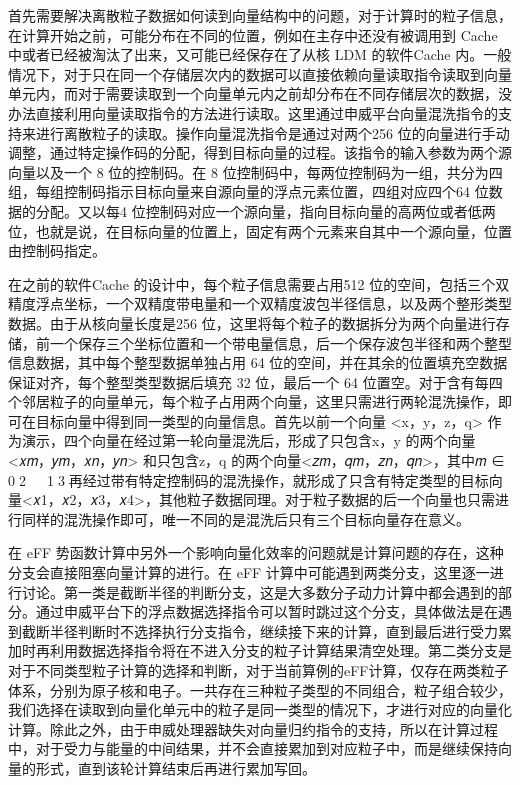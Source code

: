 首先需要解决离散粒子数据如何读到向量结构中的问题，对于计算时的粒子信息，在计算开始之前，可能分布在不同的位置，例如在主存中还没有被调用到 Cache 中或者已经被淘汰了出来，又可能已经保存在了从核 LDM 的软件Cache 内。一般情况下，对于只在同一个存储层次内的数据可以直接依赖向量读取指令读取到向量单元内，而对于需要读取到一个向量单元内之前却分布在不同存储层次的数据，没办法直接利用向量读取指令的方法进行读取。这里通过申威平台向量混洗指令的支持来进行离散粒子的读取。操作向量混洗指令是通过对两个256 位的向量进行手动调整，通过特定操作码的分配，得到目标向量的过程。该指令的输入参数为两个源向量以及一个 8 位的控制码。在 8 位控制码中，每两位控制码为一组，共分为四组，每组控制码指示目标向量来自源向量的浮点元素位置，四组对应四个64 位数据的分配。又以每4 位控制码对应一个源向量，指向目标向量的高两位或者低两位，也就是说，在目标向量的位置上，固定有两个元素来自其中一个源向量，位置由控制码指定。

在之前的软件Cache 的设计中，每个粒子信息需要占用512 位的空间，包括三个双精度浮点坐标，一个双精度带电量和一个双精度波包半径信息，以及两个整形类型数据。由于从核向量长度是256 位，这里将每个粒子的数据拆分为两个向量进行存储，前一个保存三个坐标位置和一个带电量信息，后一个保存波包半径和两个整型信息数据，其中每个整型数据单独占用 64 位的空间，并在其余的位置填充空数据保证对齐，每个整型类型数据后填充 32 位，最后一个 64 位置空。对于含有每四个邻居粒子的向量单元，每个粒子占用两个向量，这里只需进行两轮混洗操作，即可在目标向量中得到同一类型的向量信息。首先以前一个向量 <x，y，z，q> 作为演示，四个向量在经过第一轮向量混洗后，形成了只包含x，y 的两个向量<𝑥𝑚，𝑦𝑚，𝑥𝑛，𝑦𝑛> 和只包含z，q 的两个向量<𝑧𝑚，𝑞𝑚，𝑧𝑛，𝑞𝑛>，其中𝑚 ∈ 0􀀁2􀀁𝑛 ∈ 1􀀁3，再经过带有特定控制码的混洗操作，就形成了只含有特定类型的目标向量<𝑥1，𝑥2，𝑥3，𝑥4>，其他粒子数据同理。对于粒子数据的后一个向量也只需进行同样的混洗操作即可，唯一不同的是混洗后只有三个目标向量存在意义。

在 eFF 势函数计算中另外一个影响向量化效率的问题就是计算问题的存在，这种分支会直接阻塞向量计算的进行。在 eFF 计算中可能遇到两类分支，这里逐一进行讨论。第一类是截断半径的判断分支，这是大多数分子动力计算中都会遇到的部分。通过申威平台下的浮点数据选择指令可以暂时跳过这个分支，具体做法是在遇到截断半径判断时不选择执行分支指令，继续接下来的计算，直到最后进行受力累加时再利用数据选择指令将在不进入分支的粒子计算结果清空处理。第二类分支是对于不同类型粒子计算的选择和判断，对于当前算例的eFF计算，仅存在两类粒子体系，分别为原子核和电子。一共存在三种粒子类型的不同组合，粒子组合较少，我们选择在读取到向量化单元中的粒子是同一类型的情况下，才进行对应的向量化计算。除此之外，由于申威处理器缺失对向量归约指令的支持，所以在计算过程中，对于受力与能量的中间结果，并不会直接累加到对应粒子中，而是继续保持向量的形式，直到该轮计算结束后再进行累加写回。


